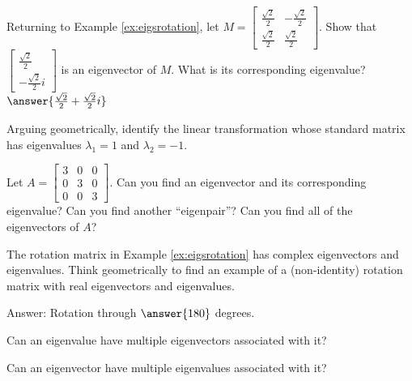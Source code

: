 \documentclass{ximera}
\begin{document}
 
\begin{problem}\label{ex:eigsrotation2}
Returning to Example \ref{ex:eigsrotation}, let $M=\begin{bmatrix}
\frac{\sqrt{2}}{2} & -\frac{\sqrt{2}}{2}\\
\frac{\sqrt{2}}{2} & \frac{\sqrt{2}}{2}
\end{bmatrix}$.  Show that $\begin{bmatrix} \frac{\sqrt{2}}{2}\\ -\frac{\sqrt{2}}{2} i \end{bmatrix}$ is an eigenvector of $M$.  What is its corresponding eigenvalue?
$\answer{\frac{\sqrt{2}}{2}+\frac{\sqrt{2}}{2}i}$
\end{problem}


\begin{problem}\label{prob:eigenvalgeometry}
Arguing geometrically, identify the linear transformation whose standard matrix has eigenvalues $\lambda_1=1$ and $\lambda_2=-1$.
\begin{multipleChoice}
  \end{multipleChoice}
\end{problem}

\begin{problem}\label{prob:eigvalvectorsofdiagmat} Let $A=\begin{bmatrix} 3&0&0\\0&3&0\\0&0&3\end{bmatrix}$.  Can you find an eigenvector and its corresponding eigenvalue?  Can you find another ``eigenpair''?  Can you find all of the eigenvectors of $A$?
\end{problem}

\begin{problem}\label{prob:rotmatrixrealeig1}The rotation matrix in Example \ref{ex:eigsrotation} has complex eigenvectors and eigenvalues.  Think geometrically to find an example of a (non-identity) rotation matrix with real eigenvectors and eigenvalues.

Answer:  Rotation through $\answer{180}$ degrees.
\end{problem}

\begin{problem}\label{prob:eigenmultchoice}
Can an eigenvalue have multiple eigenvectors associated with it? 
\begin{multipleChoice}
    \end{multipleChoice}
    
 Can an eigenvector have multiple eigenvalues associated with it?
 \begin{multipleChoice}
    \end{multipleChoice}
\end{problem}
\end{document}
